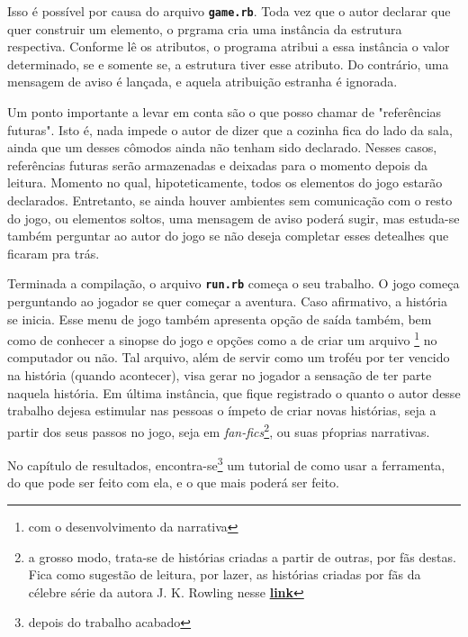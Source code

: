 Isso é possível por causa do arquivo \texttt{\textbf{game.rb}}. Toda vez que o
autor declarar que quer construir um elemento, o prgrama cria uma instância da
estrutura respectiva. Conforme lê os atributos, o programa atribui a essa
instância o valor determinado, se e somente se, a estrutura tiver esse atributo.
Do contrário, uma mensagem de aviso é lançada, e aquela atribuição estranha
é ignorada.

Um ponto importante a levar em conta são o que posso chamar de "referências
futuras". Isto é, nada impede o autor de dizer que a cozinha fica do lado da
sala, ainda que um desses cômodos ainda não tenham sido declarado. Nesses casos,
referências futuras serão armazenadas e deixadas para o momento depois da
leitura. Momento no qual, hipoteticamente, todos os elementos do jogo estarão
declarados. Entretanto, se ainda houver ambientes sem comunicação com o resto do
jogo, ou elementos soltos, uma mensagem de aviso poderá sugir, mas estuda-se
também perguntar ao autor do jogo se não deseja completar esses detealhes que
ficaram pra trás.

Terminada a compilação, o arquivo \texttt{\textbf{run.rb}} começa o seu trabalho.
O jogo começa perguntando ao jogador se quer começar a aventura. Caso afirmativo,
a história se inicia. Esse menu de jogo também apresenta opção de saída também,
bem como de conhecer a sinopse do jogo e opções como a de criar um arquivo
\footnote{com o desenvolvimento da narrativa} no computador ou não. Tal arquivo,
além de servir como um troféu por ter vencido na história (quando acontecer),
visa gerar no jogador a sensação de ter parte naquela história. Em última
instância, que fique registrado o quanto o autor desse trabalho dejesa estimular
nas pessoas o ímpeto de criar novas histórias, seja a partir dos seus passos no
jogo, seja em \emph{fan-fics}\footnote{a grosso modo, trata-se de histórias
criadas a partir de outras, por fãs  destas. Fica como sugestão de leitura,
por lazer, as histórias criadas por fãs da célebre série da autora J. K. Rowling
nesse
\href{https://super.abril.com.br/blog/turma-do-fundao/5-fanfics-para-matar-a-saudade-de-harry-potter/}{\textbf{link}}},
ou suas pŕoprias narrativas.

No capítulo de resultados, encontra-se\footnote{depois do trabalho acabado} um
tutorial de como usar a ferramenta, do que pode ser feito com ela, e o que mais
poderá ser feito.
